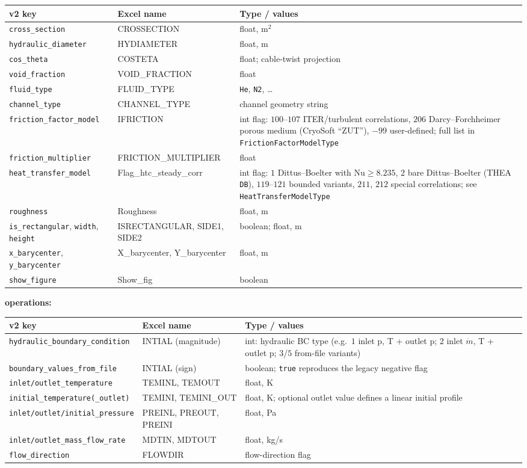 \documentclass[10pt,a4paper]{article}
\newcommand{\code}[1]{\texttt{#1}}
\begin{document}
\begin{longtable}{p{4.6cm}p{3.6cm}p{7.0cm}}
\toprule
\textbf{v2 key} & \textbf{Excel name} & \textbf{Type / values} \\
\midrule
\endhead
\code{cross\_section} & CROSSECTION & float, m$^2$ \\
\code{hydraulic\_diameter} & HYDIAMETER & float, m \\
\code{cos\_theta} & COSTETA & float; cable-twist projection \\
\code{void\_fraction} & VOID\_FRACTION & float \\
\code{fluid\_type} & FLUID\_TYPE & \code{He}, \code{N2}, \dots \\
\code{channel\_type} & CHANNEL\_TYPE & channel geometry string \\
\code{friction\_factor\_model} & IFRICTION & int flag: $100$--$107$ ITER/turbulent correlations, $206$ Darcy--Forchheimer porous medium (CryoSoft ``ZUT''), $-99$ user-defined; full list in \code{FrictionFactorModelType} \\
\code{friction\_multiplier} & FRICTION\_MULTIPLIER & float \\
\code{heat\_transfer\_model} & Flag\_htc\_steady\_corr & int flag: $1$ Dittus--Boelter with $\mathrm{Nu}\ge 8.235$, $2$ bare Dittus--Boelter (THEA \code{DB}), $119$--$121$ bounded variants, $211$, $212$ special correlations; see \code{HeatTransferModelType} \\
\code{roughness} & Roughness & float, m \\
\code{is\_rectangular}, \code{width}, \code{height} & ISRECTANGULAR, SIDE1, SIDE2 & boolean; float, m \\
\code{x\_barycenter}, \code{y\_barycenter} & X\_barycenter, Y\_barycenter & float, m \\
\code{show\_figure} & Show\_fig & boolean \\
\bottomrule
\end{longtable}

\textbf{operations:}

\begin{longtable}{p{5.2cm}p{3.0cm}p{7.0cm}}
\toprule
\textbf{v2 key} & \textbf{Excel name} & \textbf{Type / values} \\
\midrule
\endhead
\code{hydraulic\_boundary\_condition} & INTIAL (magnitude) & int: hydraulic BC type (e.g.\ $1$ inlet p, T + outlet p; $2$ inlet $\dot m$, T + outlet p; $3$/$5$ from-file variants) \\
\code{boundary\_values\_from\_file} & INTIAL (sign) & boolean; \code{true} reproduces the legacy negative flag \\
\code{inlet/outlet\_temperature} & TEMINL, TEMOUT & float, K \\
\code{initial\_temperature(\_outlet)} & TEMINI, TEMINI\_OUT & float, K; optional outlet value defines a linear initial profile \\
\code{inlet/outlet/initial\_pressure} & PREINL, PREOUT, PREINI & float, Pa \\
\code{inlet/outlet\_mass\_flow\_rate} & MDTIN, MDTOUT & float, kg/s \\
\code{flow\_direction} & FLOWDIR & flow-direction flag \\
\bottomrule
\end{longtable}
\end{document}
